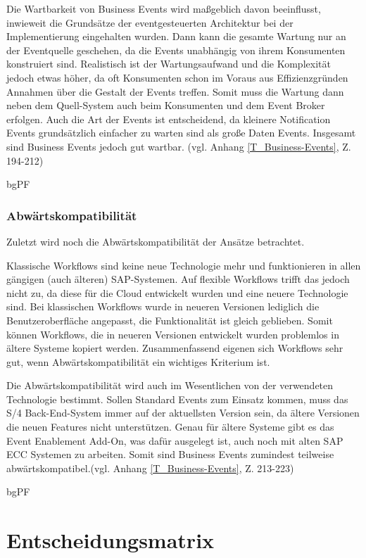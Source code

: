 Die Wartbarkeit von Business Events wird ma{\ss}geblich davon beeinflusst, inwieweit die Grundsätze der eventgesteuerten Architektur bei der Implementierung eingehalten wurden. Dann kann die gesamte Wartung nur an der Eventquelle geschehen, da die Events unabhängig von ihrem Konsumenten konstruiert sind. Realistisch ist der Wartungsaufwand und die Komplexität jedoch etwas höher, da oft Konsumenten schon im Voraus aus Effizienzgründen Annahmen über die Gestalt der Events treffen. Somit muss die Wartung dann neben dem Quell-System auch beim Konsumenten und dem Event Broker erfolgen. Auch die Art der Events ist entscheidend, da kleinere Notification Events grundsätzlich einfacher zu warten sind als gro{\ss}e Daten Events. Insgesamt sind Business Events jedoch gut wartbar. (vgl. Anhang \ref{T_Business-Events}, Z. 194-212)

bgPF

\subsubsection{Abwärtskompatibilität}

Zuletzt wird noch die Abwärtskompatibilität der Ansätze betrachtet. 

Klassische Workflows sind keine neue Technologie mehr und funktionieren in allen gängigen (auch älteren) SAP-Systemen. Auf flexible Workflows trifft das jedoch nicht zu, da diese für die Cloud entwickelt wurden und eine neuere Technologie sind. Bei klassischen Workflows wurde in neueren Versionen lediglich die Benutzeroberfläche angepasst, die Funktionalität ist gleich geblieben. Somit können Workflows, die in neueren Versionen entwickelt wurden problemlos in ältere Systeme kopiert werden. Zusammenfassend eigenen sich Workflows sehr gut, wenn Abwärtskompatibilität ein wichtiges Kriterium ist.

Die Abwärtskompatibilität wird auch im Wesentlichen von der verwendeten Technologie bestimmt. Sollen Standard Events zum Einsatz kommen, muss das S/4 Back-End-System immer auf der aktuellsten Version sein, da ältere Versionen die neuen Features nicht unterstützen. Genau für ältere Systeme gibt es das Event Enablement Add-On, was dafür ausgelegt ist, auch noch mit alten SAP ECC Systemen zu arbeiten. Somit sind Business Events zumindest teilweise abwärtskompatibel.(vgl. Anhang \ref{T_Business-Events}, Z. 213-223)

bgPF

\section{Entscheidungsmatrix}

